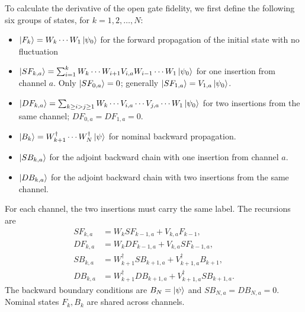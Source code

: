 \documentclass{simple-notes}
\begin{document}
To calculate the derivative of the open gate fidelity, we first define the following six groups of states, for $k = 1, 2,\ldots, N$:
\begin{itemize}
    \item $\ket{F_k} = W_k\cdots W_1\ket{\psi_0}$ for the forward propagation of the initial state with no fluctuation
    \item $\ket{SF_{k,a}} = \sum_{i=1}^k W_k\cdots W_{i+1}V_{i,a} W_{i-1} \cdots W_1\ket{\psi_0}$ for one insertion from channel $a$. Only $\ket{SF_{0,a}}=0$; generally $\ket{SF_{1,a}}=V_{1,a}\ket{\psi_0}$.
    \item $\ket{DF_{k,a}} = \sum_{k\geq i>j\geq1}W_k\cdots V_{i,a} \cdots V_{j,a} \cdots W_1\ket{\psi_0}$ for two insertions from the same channel; $DF_{0,a}=DF_{1,a}=0$.
    \item $\ket{B_k}=W_{k+1}^\dagger\cdots W_N^\dagger\ket{\psi}$ for nominal backward propagation.
    \item $\ket{SB_{k,a}}$ for the adjoint backward chain with one insertion from channel $a$.
    \item $\ket{DB_{k,a}}$ for the adjoint backward chain with two insertions from the same channel.
\end{itemize}
For each channel, the two insertions must carry the same label. The recursions are
\begin{align*}
SF_{k,a} &= W_k SF_{k-1,a}+V_{k,a}F_{k-1},\\
DF_{k,a} &= W_k DF_{k-1,a}+V_{k,a}SF_{k-1,a},\\
SB_{k,a} &= W_{k+1}^\dagger SB_{k+1,a}+V_{k+1,a}^\dagger B_{k+1},\\
DB_{k,a} &= W_{k+1}^\dagger DB_{k+1,a}+V_{k+1,a}^\dagger SB_{k+1,a}.
\end{align*}
The backward boundary conditions are $B_N=\ket{\psi}$ and
$SB_{N,a}=DB_{N,a}=0$. Nominal states $F_k,B_k$ are shared across channels.
\end{document}
